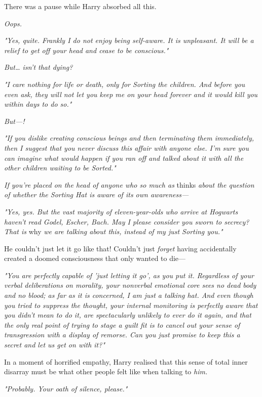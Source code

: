 There was a pause while Harry absorbed all this.

\emph{Oops.}

\emph{"Yes, quite. Frankly I do not enjoy being self-aware. It is unpleasant. 
It will be a relief to get off your head and cease to be conscious."}

\emph{But{\ldots} isn't that dying?}

\emph{"I care nothing for life or death, only for Sorting the children. And 
before you even ask, they will not let you keep me on your head forever and it 
would kill you within days to do so."}

\emph{But---!}

\emph{"If you dislike creating conscious beings and then terminating them 
immediately, then I suggest that you never discuss this affair with anyone 
else. I'm sure you can imagine what would happen if you ran off and talked 
about it with all the other children waiting to be Sorted."}

\emph{If you're placed on the head of anyone who so much as} thinks\emph{ about 
the question of whether the Sorting Hat is aware of its own awareness---}

\emph{"Yes, yes. But the vast majority of eleven-year-olds who arrive at 
Hogwarts haven't read Godel, Escher, Bach. May I please consider you sworn to 
secrecy? That is} why\emph{ we are talking about this, instead of my just 
Sorting you."}

He couldn't just let it go like that! Couldn't just \emph{forget} having 
accidentally created a doomed consciousness that only wanted to die---

\emph{"You are perfectly capable of 'just letting it go', as you put it. 
Regardless of your verbal deliberations on morality, your nonverbal emotional 
core sees no dead body and no blood; as far as it is concerned, I am just a 
talking hat. And even though you tried to suppress the thought, your internal 
monitoring is perfectly aware that you didn't mean to do it, are spectacularly 
unlikely to ever do it again, and that the only real point of trying to stage a 
guilt fit is to cancel out your sense of transgression with a display of 
remorse. Can you just promise to keep this a secret and let us get on with it?"}

In a moment of horrified empathy, Harry realised that this sense of total inner 
disarray must be what other people felt like when talking to \emph{him.}

\emph{"Probably. Your oath of silence, please."}

